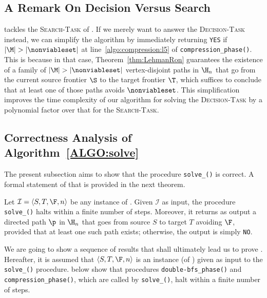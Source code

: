 \subsection{A Remark On Decision Versus Search}\label{sect:remark_dec_search}

tackles
the \textsc{Search-Task} of \mainproblem.
If
we merely want to answer the \textsc{Decision-Task} instead,
we can simplify the algorithm
by immediately returning \texttt{YES} if $|\M|>|\nonviableset|$ at line~\ref{algo:compression:l5} of \texttt{compression\_phase()}.
This is because in that case,
Theorem~\ref{thm:LehmanRon} guarantees the existence of a family of
$|\M|>|\nonviableset|$ vertex-disjoint paths in $\H_n$
that go from the current source frontier $\S$ to the target frontier $\T$,
which suffices to conclude that at least one of those paths avoids $\nonviableset$.
This simplification
improves the time complexity of our algorithm for solving the \textsc{Decision-Task} by a polynomial factor
over that for the \textsc{Search-Task}.

\subsection{Correctness Analysis of Algorithm~\ref{ALGO:solve}}\label{subsect:correctness}
The present subsection aims to show that the procedure \texttt{solve\_\mainproblem()} is correct.
A formal statement of that is provided in the next theorem.

\begin{theorem}\label{thm:correctness_main}
Let $\mathcal{I}=\langle S, T, \F, n\rangle$ be any instance of \mainproblem.
Given $\mathcal{I}$ as input, the procedure \texttt{solve\_\mainproblem()} halts within a finite number of steps.
Moreover, it returns as output a directed path $\p$ in $\H_n$ that goes from source $S$ to target $T$ avoiding $\F$,
provided that at least one such path exists; otherwise, the output is simply \texttt{NO}.
\end{theorem}

We are going to show a sequence of results that shall ultimately lead us to prove .
Hereafter, it is assumed that $\langle S, T, \F, n\rangle$ is an instance
(of \mainproblem) given as input to the \texttt{solve\_\mainproblem()} procedure.  below show that procedures \texttt{double-bfs\_phase()} and \texttt{compression\_phase()}, which are called by \texttt{solve\_\mainproblem()}, halt within a finite number of steps.


